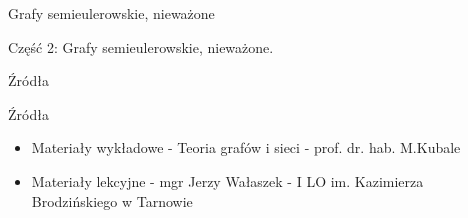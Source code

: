 \documentclass[polish,envcountsect,10pt]{beamer}
\begin{document}
\begin{frame}{Grafy semieulerowskie, nieważone}
    \begin{block}{}
        Część 2: Grafy semieulerowskie, nieważone.
    \end{block}
\end{frame}

\begin{frame}{Źródła}
    \begin{block}{Źródła}
        \begin{itemize}
            \item Materiały wykładowe - Teoria grafów i sieci - prof. dr. hab. M.Kubale
            \item Materiały lekcyjne - mgr Jerzy Wałaszek - I LO im. Kazimierza Brodzińskiego w Tarnowie
        \end{itemize}
    \end{block}
\end{frame}
\end{document}
